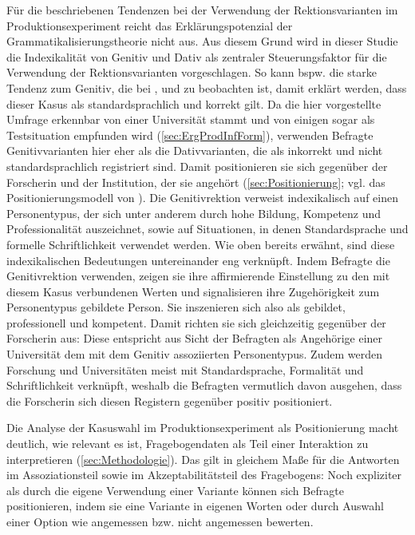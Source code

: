 Für die beschriebenen Tendenzen bei der Verwendung der Rektionsvarianten im Produktionsexperiment reicht das Erklärungspotenzial der Grammatikalisierungstheorie nicht aus. 
Aus diesem Grund wird in dieser Studie die Indexikalität von Genitiv und Dativ als zentraler Steuerungsfaktor für die Verwendung der Rektionsvarianten vorgeschlagen. 
So kann bspw. die starke Tendenz zum Genitiv, die bei \wegen{}, \waehrend{} und \dank{} zu beobachten ist, damit erklärt werden, dass dieser Kasus als standardsprachlich und korrekt gilt. 
Da die hier vorgestellte Umfrage erkennbar von einer Universität stammt und von einigen sogar als Testsituation empfunden wird (\autoref{sec:ErgProdInfForm}), verwenden Befragte Genitivvarianten hier eher als die Dativvarianten, die als inkorrekt und nicht standardsprachlich registriert sind. 
Damit positionieren sie sich gegenüber der Forscherin und der Institution, der sie angehört (\autoref{sec:Positionierung}; vgl. das Positionierungsmodell von \citealp{Spitzmuller2013}). 
Die Genitivrektion verweist indexikalisch auf einen Personentypus, der sich unter anderem durch hohe Bildung, Kompetenz und Professionalität auszeichnet, sowie auf Situationen, in denen Standardsprache und formelle Schriftlichkeit verwendet werden. 
Wie oben bereits erwähnt, sind diese indexikalischen Bedeutungen untereinander eng verknüpft. 
Indem Befragte die Genitivrektion verwenden, zeigen sie ihre affirmierende Einstellung zu den mit diesem Kasus verbundenen Werten und signalisieren ihre Zugehörigkeit zum Personentypus \glqq gebildete Person\grqq{}. 
Sie inszenieren sich also als gebildet, professionell und kompetent. 
Damit richten sie sich gleichzeitig gegenüber der Forscherin aus: 
Diese entspricht aus Sicht der Befragten als Angehörige einer Universität dem mit dem Genitiv assoziierten Personentypus. 
Zudem werden Forschung und Universitäten meist mit Standardsprache, Formalität und Schriftlichkeit verknüpft, weshalb die Befragten vermutlich davon ausgehen, dass die Forscherin sich diesen Registern gegenüber positiv positioniert. 

Die Analyse der Kasuswahl im Produktionsexperiment als Positionierung macht deutlich, wie relevant es ist, Fragebogendaten als Teil einer Interaktion zu interpretieren (\autoref{sec:Methodologie}).
Das gilt in gleichem Maße für die Antworten im Assoziationsteil sowie im Akzeptabilitätsteil des Fragebogens:
Noch expliziter als durch die eigene Verwendung einer Variante können sich Befragte positionieren, indem sie eine Variante in eigenen Worten oder durch Auswahl einer Option wie \glqq angemessen\grqq{} bzw. \glqq nicht angemessen\grqq{} bewerten. 

